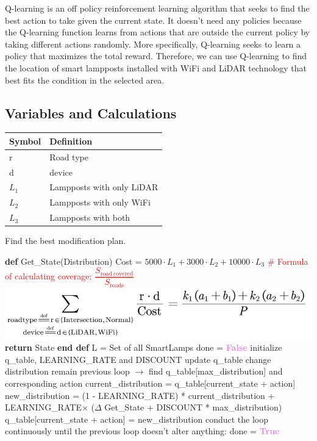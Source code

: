 \documentclass[12pt]{article}
\theoremstyle{definition}
\theoremstyle{remark}
\numberwithin{equation}{section}
\begin{document}
		Q-learning\cite{Qlearning} is an off policy reinforcement learning algorithm that seeks to find the best action to take given the current state. It doesn't need any policies because the Q-learning function learns from actions that are outside the current policy by taking different actions randomly. More specifically, Q-learning seeks to learn a policy that maximizes the total reward. Therefore, we can use Q-learning to find the location of smart lampposts installed with WiFi and LiDAR technology that best fits the condition in the selected area.
		\subsection{Variables and Calculations}
		\begin{center}
		\begin{tabular}{ll}
			\hline
			Symbol&Definition\\
			\hline
			r&Road type\\
			d&device\\
			$L_1$&Lampposts with only LiDAR\\
			$L_2$&Lampposts with only WiFi\\
			$L_3$&Lampposts with both\\
			\hline
		\end{tabular}
		\end{center}
	\begin{algorithm}
		\caption{Find the best modification plan.}
		\label{Type}
		\begin{algorithmic}
		\STATE \textbf{def} Get\_State(Distribution)
		\STATE Cost = $5000\cdot L_1+3000\cdot  L_2+10000\cdot L_3 $
		\STATE \textcolor{red}{\# Formula of calculating coverage: $\dfrac{S_{\mathrm{road\ covered}}}{S_{\mathrm{roads}}}$​​}
		\STATE \includegraphics[scale=0.6]{formula.jpg}
		\STATE \textbf{return} State
		\STATE \textbf{end def}
		\STATE L = Set of all SmartLamps
		\STATE done = \textbf{\textcolor{violet}{False}}
		\STATE initialize q\_table, LEARNING\_RATE and DISCOUNT
		\STATE update q\_table
		\ENDWHILE
		\STATE change distribution
		\ELSE
		\STATE remain
		\ENDIF
		\ENDWHILE
		\ENDFOR
		\STATE previous loop $\rightarrow$ find q\_table[max\_distribution] and corresponding action
		\STATE current\_distribution = q\_table[current\_state + action]
		\STATE new\_distribution = (1 - LEARNING\_RATE) * current\_distribution +\\ LEARNING\_RATE$\times$ ($\Delta$ Get\_State + DISCOUNT * max\_distribution)
		\STATE q\_table[current\_state + action] = new\_distribution
		\STATE conduct the loop continuously until the previous loop doesn't alter anything:
		\STATE done = \textbf{\textcolor{violet}{True}}
		\end{algorithmic}
	\end{algorithm}
\end{document}
